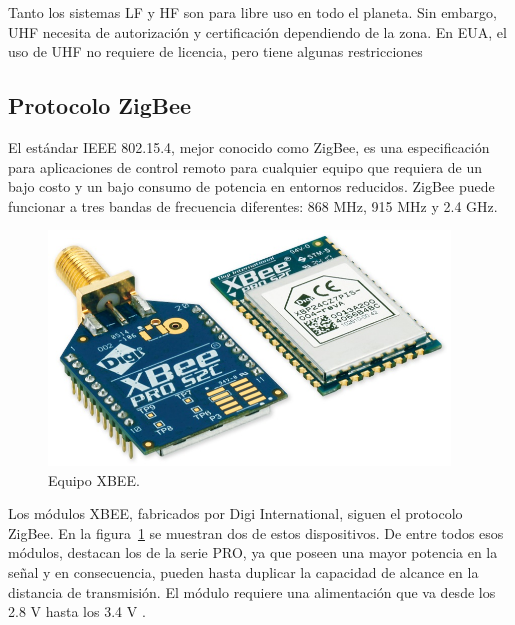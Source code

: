 Tanto los sistemas LF y HF son para libre uso en todo el planeta. Sin embargo, UHF necesita de autorización y certificación dependiendo de la zona. En EUA, el uso de UHF no requiere de licencia, pero tiene algunas restricciones \citep{tapia2007identificacion}

\subsection{Protocolo ZigBee}

El estándar IEEE 802.15.4, mejor conocido como ZigBee, es una especificación para aplicaciones de control remoto para cualquier equipo que requiera de un bajo costo y un bajo consumo de potencia en entornos reducidos. ZigBee puede funcionar a tres bandas de frecuencia diferentes: 868 MHz, 915 MHz y 2.4 GHz. \\

\begin{figure}[ht]
\centering
\includegraphics[width=0.95\textwidth]{Figures/xbee}
\caption[Equipo XBEE.]{Equipo XBEE\footnotemark.}
\label{fig:XBEE}
\end{figure}


Los módulos XBEE, fabricados por Digi International, siguen el protocolo ZigBee. En la figura~\ref{fig:XBEE} se muestran dos de estos dispositivos. De entre todos esos módulos, destacan los de la serie PRO, ya que poseen una mayor potencia en la señal y en consecuencia, pueden hasta duplicar la capacidad de alcance en la distancia de transmisión. El módulo requiere una alimentación que va desde los 2.8 V hasta los 3.4 V \citep{oyarce2010guia}.

